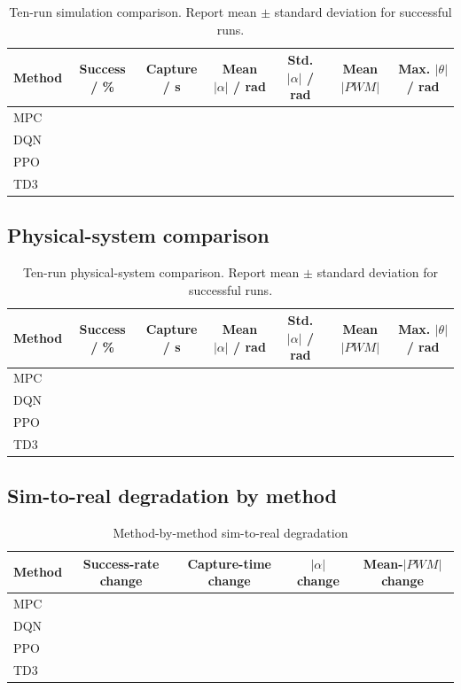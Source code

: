 \documentclass[11pt,a4paper]{article}
\begin{document}
\begin{table}[H]
\centering
\caption{Ten-run simulation comparison. Report mean $\pm$ standard deviation for successful runs.}
\label{tab:allsimcompare}
\scriptsize
\begin{tabularx}{\linewidth}{l C C C C C C}
\toprule
Method & Success / \% & Capture / s & Mean $|\alpha|$ / rad & Std. $|\alpha|$ / rad
& Mean $|PWM|$ & Max. $|\theta|$ / rad\\
\midrule
MPC & & & & & & \\
DQN & & & & & & \\
PPO & & & & & & \\
TD3 & & & & & & \\
\bottomrule
\end{tabularx}
\end{table}

\subsection{Physical-system comparison}

\begin{table}[H]
\centering
\caption{Ten-run physical-system comparison. Report mean $\pm$ standard deviation for successful runs.}
\label{tab:allhwcompare}
\scriptsize
\begin{tabularx}{\linewidth}{l C C C C C C}
\toprule
Method & Success / \% & Capture / s & Mean $|\alpha|$ / rad & Std. $|\alpha|$ / rad
& Mean $|PWM|$ & Max. $|\theta|$ / rad\\
\midrule
MPC & & & & & & \\
DQN & & & & & & \\
PPO & & & & & & \\
TD3 & & & & & & \\
\bottomrule
\end{tabularx}
\end{table}

\subsection{Sim-to-real degradation by method}

\begin{table}[H]
\centering
\caption{Method-by-method sim-to-real degradation}
\label{tab:allgaps}
\small
\begin{tabularx}{\linewidth}{l C C C C}
\toprule
Method & Success-rate change & Capture-time change & $|\alpha|$ change
& Mean-$|PWM|$ change\\
\midrule
MPC & & & & \\
DQN & & & & \\
PPO & & & & \\
TD3 & & & & \\
\bottomrule
\end{tabularx}
\end{table}
\end{document}
